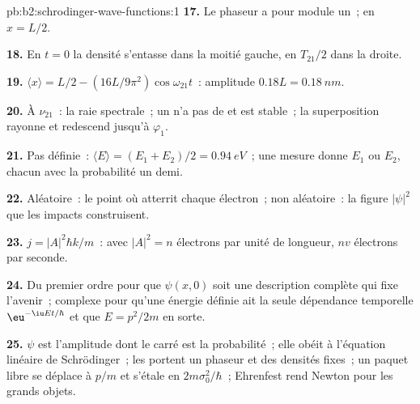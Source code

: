 \begin{solution}{pb:b2:schrodinger-wave-functions:1}
\textbf{17.} Le phaseur a pour module un~; en $x = L/2$.

\textbf{18.} En $t = 0$ la densité s'entasse dans la moitié gauche, en
$T_{21}/2$ dans la droite.

\textbf{19.} $\langle x\rangle = L/2 - (16L/9\pi^2)\cos\omega_{21}t$~: amplitude
$0.18L = \qty{0.18}{nm}$.

\textbf{20.} À $\nu_{21}$~: la raie spectrale~; un  n'a pas de
 et est stable~; la superposition rayonne et redescend
jusqu'à $\varphi_1$.

\textbf{21.} Pas définie~: $\langle E\rangle = (E_1 + E_2)/2 = \qty{0.94}{eV}$~; une
mesure donne $E_1$ ou $E_2$, chacun avec la probabilité un demi.

\textbf{22.} Aléatoire~: le point où atterrit chaque électron~; non aléatoire~: la
figure $|\psi|^2$ que les impacts construisent.

\textbf{23.} $j = |A|^2\hbar k/m$~: avec $|A|^2 = n$ électrons par unité de longueur,
$nv$ électrons par seconde.

\textbf{24.} Du premier ordre pour que $\psi(x,0)$ soit une description complète
qui fixe l'avenir~; complexe pour qu'une énergie définie ait la seule
dépendance temporelle $\eu^{-\iu Et/\hbar}$ et que $E = p^2/2m$ en sorte.

\textbf{25.} $\psi$ est l'amplitude dont le carré est la probabilité~; elle
obéit à l'équation linéaire de Schrödinger~; les  portent un
phaseur et des densités fixes~; un paquet libre se déplace à $p/m$ et s'étale
en $2m\sigma_0^2/\hbar$~; Ehrenfest rend Newton pour les grands objets.
\end{solution}
